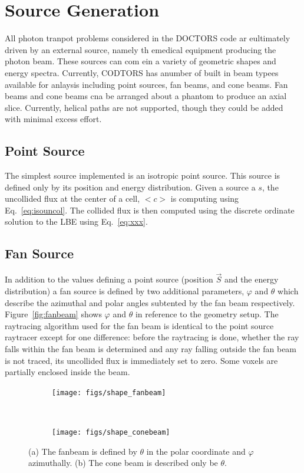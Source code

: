 \section{Source Generation}
All photon tranpot problems considered in the DOCTORS code ar eultimately driven by an external source, namely th emedical equipment producing the photon beam. These sources can com ein a variety of geometric shapes and energy spectra. Currently, CODTORS has  anumber of built in beam typees available for anlaysis including point sources, fan beams, and cone beams. Fan beams and cone beams cna be arranged about a phantom to produce an axial slice. Currently, helical paths are not supported, though they could be added with minimal excess effort.

\subsection{Point Source}
The simplest source implemented is an isotropic point source. This source is defined only by its position and energy distribution. Given a source a $s$, the uncollided flux at the center of a cell, $<c>$ is computing using Eq.~\ref{eq:isouncol}. The collided flux is then computed using the discrete ordinate solution to the LBE using Eq.~\ref{eq:xxx}.

\subsection{Fan Source}
In addition to the values defining a point source (position $\vec{S}$ and the energy distribution) a fan source is defined by two additional parameters, $\varphi$ and $\theta$ which describe the azimuthal and polar angles subtented by the fan beam respectively. Figure~\ref{fig:fanbeam} shows $\varphi$ and $\theta$ in reference to the geometry setup. The raytracing algorithm used for the fan beam is identical to the point source raytracer except for one difference: before the raytracing is done, whether the ray falls within the fan beam is determined and any ray falling outside the fan beam is not traced, its uncollided flux is immediately set to zero. Some voxels are partially enclosed inside the beam.

\begin{figure}
    \centering
    \begin{subfigure}[b]{.45 \textwidth}
        \texttt{[image: figs/shape\_fanbeam]}
        \caption{}
        \label{fig:shape_fanbeam}
    \end{subfigure}
    ~
    \begin{subfigure}[b]{.45 \textwidth}
        \texttt{[image: figs/shape\_conebeam]}
        \caption{}
        \label{fig:shape_conebeam}
    \end{subfigure}
    \caption{(a) The fanbeam is defined by $\theta$ in the polar coordinate and $\varphi$ azimuthally. (b) The cone beam is described only be $\theta$.}\label{fig:shape}
\end{figure}

